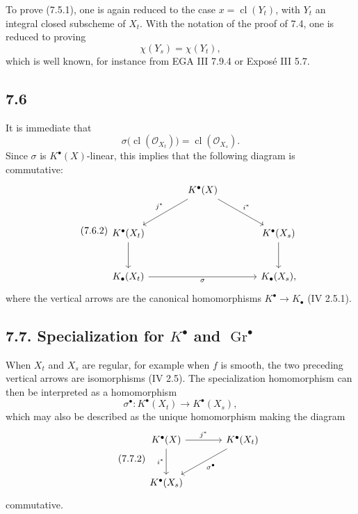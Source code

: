 \documentclass[11pt]{article}
\newcommand{\Gr}{\operatorname{Gr}}
\newcommand{\cl}{\operatorname{cl}}
\providecommand{\Gr}{\operatorname{Gr}}
\providecommand{\Gr}{\operatorname{G}}
\begin{document}
To prove (7.5.1), one is again reduced to the case \(x=\cl(Y_t)\), with \(Y_t\) an integral closed subscheme of \(X_t\). With the notation of the proof of 7.4, one is reduced to proving
\[
  \chi(Y_s)=\chi(Y_t),
\]
which is well known, for instance from EGA III 7.9.4 or Exposé III 5.7.

\subsection*{7.6}
It is immediate that
\begin{equation}\tag{7.6.1}
  \sigma\bigl(\cl(\mathcal O_{X_t})\bigr)=\cl(\mathcal O_{X_s}).
\end{equation}
Since \(\sigma\) is \(K^\bullet(X)\)-linear, this implies that the following diagram is commutative:
\begin{equation}\tag{7.6.2}
\begin{tikzcd}[column sep=large,row sep=large]
& K^\bullet(X) \arrow[dl,"j^*"'] \arrow[dr,"i^*"] &\\
K^\bullet(X_t) \arrow[d] && K^\bullet(X_s) \arrow[d]\\
K_\bullet(X_t) \arrow[rr,"\sigma"'] && K_\bullet(X_s),
\end{tikzcd}
\end{equation}
where the vertical arrows are the canonical homomorphisms \(K^\bullet\to K_\bullet\) (IV 2.5.1).

\subsection*{7.7. Specialization for \(K^\bullet\) and \(\Gr^\bullet\)}
When \(X_t\) and \(X_s\) are regular, for example when \(f\) is smooth, the two preceding vertical arrows are isomorphisms (IV 2.5). The specialization homomorphism can then be interpreted as a homomorphism
\begin{equation}\tag{7.7.1}
  \sigma^\bullet:K^\bullet(X_t)\longrightarrow K^\bullet(X_s),
\end{equation}
which may also be described as the unique homomorphism making the diagram
\begin{equation}\tag{7.7.2}
\begin{tikzcd}[column sep=large,row sep=large]
K^\bullet(X) \arrow[r,"j^*"] \arrow[d,"i^*"'] & K^\bullet(X_t) \arrow[dl,"\sigma^\bullet"]\\
K^\bullet(X_s) &
\end{tikzcd}
\end{equation}
commutative.
\end{document}
